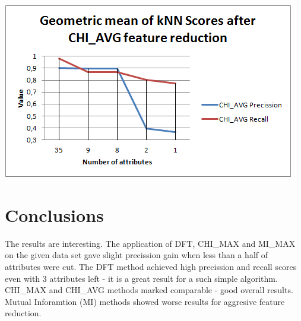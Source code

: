 \documentclass[12pt,a4paper]{report}
\begin{document}
\includegraphics[scale=1]{CHIAVGscores}

\chapter{Conclusions}
The results are interesting. The application of DFT, CHI\_MAX and MI\_MAX on the given data set gave slight precission gain when less than a half of attributes were cut. The DFT method achieved high precission and recall scores even with 3 attributes left - it is a great result for a such simple algorithm. CHI\_MAX and CHI\_AVG methods marked comparable - good overall results. Mutual Inforamtion (MI) methods showed worse results for aggresive feature reduction.
\end{document}
